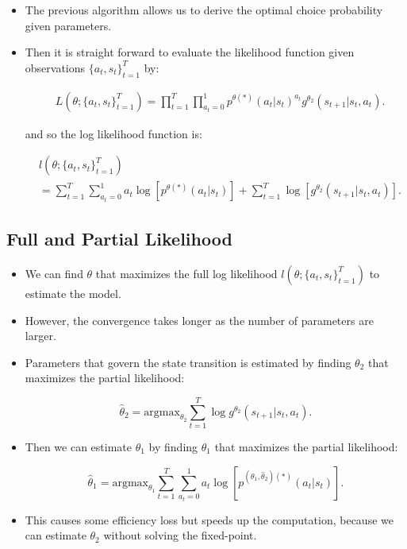 \documentclass[]{book}
\providecommand{\tightlist}{%
  \setlength{\itemsep}{0pt}\setlength{\parskip}{0pt}}
\begin{document}
\begin{itemize}
\tightlist
\item
  The previous algorithm allows us to derive the optimal choice
  probability given parameters.
\item
  Then it is straight forward to evaluate the likelihood function given
  observations \(\{a_t, s_t\}_{t = 1}^T\) by:

  \begin{equation}
  \begin{split}
  &L(\theta; \{a_t, s_t\}_{t = 1}^T) =\prod_{t = 1}^T \prod_{a_t = 0}^1 p^{\theta (\ast)}(a_t|s_t)^{a_t} g^{\theta_2} (s_{t + 1}|s_t, a_t).
  \end{split}
  \end{equation}

  and so the log likelihood function is:

  \begin{equation}
  \begin{split}
  &l(\theta; \{a_t, s_t\}_{t = 1}^T)\\
  &=\sum_{t = 1}^T \sum_{a_t = 0}^1 a_t \log [p^{\theta (\ast)}(a_t|s_t)] + \sum_{t = 1}^T \log [g^{\theta_2} (s_{t + 1}|s_t, a_t)].
  \end{split}
  \end{equation}
\end{itemize}

\subsection{Full and Partial
Likelihood}\label{full-and-partial-likelihood}

\begin{itemize}
\tightlist
\item
  We can find \(\theta\) that maximizes the full log likelihood
  \(l(\theta; \{a_t, s_t\}_{t = 1}^T)\) to estimate the model.
\item
  However, the convergence takes longer as the number of parameters are
  larger.
\item
  Parameters that govern the state transition is estimated by finding
  \(\theta_2\) that maximizes the partial likelihood:

  \begin{equation}
  \hat{\theta}_2 = \text{argmax}_{\theta_2} \sum_{t = 1}^T \log g^{\theta_2}(s_{t + 1}|s_t, a_t).
  \end{equation}
\item
  Then we can estimate \(\theta_1\) by finding \(\theta_1\) that
  maximizes the partial likelihood:

  \begin{equation}
  \hat{\theta}_1 = \text{argmax}_{\theta_1} \sum_{t = 1}^T \sum_{a_t = 0}^1 a_t \log [p^{(\theta_1, \hat{\theta}_2) (\ast)}(a_t|s_t)].
  \end{equation}
\item
  This causes some efficiency loss but speeds up the computation,
  because we can estimate \(\theta_2\) without solving the fixed-point.
\end{itemize}
\end{document}
